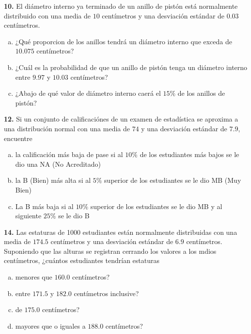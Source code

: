 \documentclass[12pt, letterpaper]{article}
\begin{document}
    \textbf{10. }El diámetro interno ya terminado de un anillo de pistón está normalmente distribuido con una media de $10$
    centímetros y una desviación estándar de $0.03$ centímetros.
        \begin{enumerate}[a)]
            \item ¿Qué proporcion de los anillos tendrá un diámetro interno que exceda de $10.075$ centímetros?
            \item ¿Cuál es la probabilidad de que un anillo de pistón tenga un diámetro interno entre $9.97$ y $10.03$
                    centímetros?
            \item ¿Abajo de qué valor de diámetro interno caerá el $15\%$ de los anillos de pistón?
        \end{enumerate}\vskip1cm

    \textbf{12. }Si un conjunto de calificaciónes de un examen de estadística se aproxima a una distribución normal con
    una media de $74$ y una desviación estándar de $7.9$, encuentre
        \begin{enumerate}[a)]
            \item la calificación más baja de pase si al $10\%$ de los estudiantes más bajos se le dio una NA (No Acreditado)
            \item la B (Bien) más alta si al $5\%$ superior de los estudiantes se le dio MB (Muy Bien)
            \item La B más baja si al $10\%$ superior de los estudiantes se le dio MB y al siguiente $25\%$ se le dio B
        \end{enumerate}\vskip1cm

    \textbf{14. }Las estaturas de 1000 estudiantes están normalmente distribuidas con una media de $174.5$ centímetros y
    una desviación estándar de $6.9$ centímetros. Suponiendo  que las alturas se registran cerrando los valores a los mdios
    centímetros, ¿cuántos estudiantes tendrían estaturas
        \begin{enumerate}[a)]
            \item menores que $160.0$ centímetros?
            \item entre $171.5$ y $182.0$ centímetros inclusive?
            \item de $175.0$ centímetros?
            \item mayores que o iguales a $188.0$ centímetros?
        \end{enumerate}\vskip1cm
        
\end{document}
